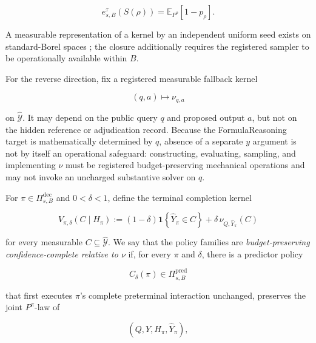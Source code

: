 \documentclass[10pt]{article} %
\providecommand{\1}{\mathbf{1}}  %
\theoremstyle{remark}
\theoremstyle{definition}
\begin{document}
\begin{equation}
e_{s,B}^{\tau}\!\left(S(\rho)\right)
=
\mathbb E_{P^\rho}\!\left[1-p_\rho\right].
\label{eq:sampling-closure-risk-form}
\end{equation}

A measurable representation of a kernel by an independent uniform seed
exists on standard-Borel spaces
\citep[Chapter~4]{kallenberg2021foundations}; the closure additionally
requires the registered sampler to be operationally available within $B$.

For the reverse direction, fix a registered measurable fallback kernel

\begin{equation}
(q,a)\longmapsto\nu_{q,a}
\end{equation}

on $\widehat{\mathcal Y}$. It may depend on the public query $q$ and proposed output $a$, but not on the hidden reference or adjudication record. Because the FormulaReasoning target is mathematically determined by $q$, absence of a separate $y$ argument is not by itself an operational safeguard: constructing, evaluating, sampling, and implementing $\nu$ must be registered budget-preserving mechanical operations and may not invoke an uncharged substantive solver on $q$.

For $\pi\in\Pi_{s,B}^{\mathrm{dec}}$ and $0<\delta<1$, define the terminal completion kernel

\begin{equation}
V_{\pi,\delta}(C\mid H_\pi)
:=
(1-\delta)
\mathbf 1\!\left\{
\widehat Y_\pi\in C
\right\}
+
\delta\,
\nu_{Q,\widehat Y_\pi}(C)
\label{eq:open-confidence-completion}
\end{equation}

for every measurable $C\subseteq\widehat{\mathcal Y}$. We say that the policy families are \emph{budget-preserving confidence-complete relative to $\nu$} if, for every $\pi$ and $\delta$, there is a predictor policy

\begin{equation}
C_\delta(\pi)\in\Pi_{s,B}^{\mathrm{pred}}
\end{equation}

that first executes $\pi$'s complete preterminal interaction unchanged, preserves the joint $P^\pi$-law of

\begin{equation}
(Q,Y,H_\pi,\widehat Y_\pi),
\end{equation}
\end{document}
